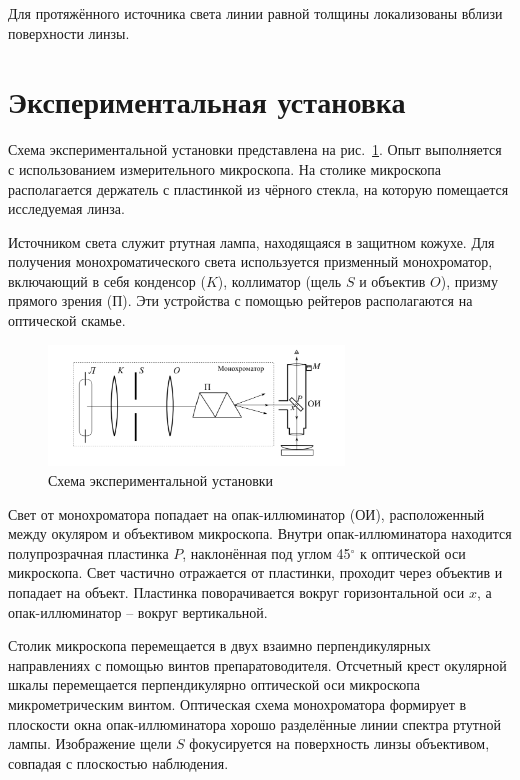 \documentclass[a4paper, 12pt]{article}
\begin{document}
Для протяжённого источника света линии равной толщины локализованы вблизи поверхности линзы.

\section*{Экспериментальная установка}
\quad Схема экспериментальной установки представлена на рис.~\ref{fig:setup}. Опыт выполняется с использованием измерительного микроскопа. На столике микроскопа располагается держатель с пластинкой из чёрного стекла, на которую помещается исследуемая линза.

Источником света служит ртутная лампа, находящаяся в защитном кожухе. Для получения монохроматического света используется призменный монохроматор, включающий в себя конденсор (\( K \)), коллиматор (щель \( S \) и объектив \( O \)), призму прямого зрения (\( П \)).  Эти устройства с помощью рейтеров располагаются на оптической скамье. 

\begin{figure}[H]
    \centering
    \includegraphics[width=0.7\textwidth]{setup.png}
    \caption{Схема экспериментальной установки}
    \label{fig:setup}
\end{figure}

Свет от монохроматора попадает на опак-иллюминатор (ОИ), расположенный между окуляром и объективом микроскопа. Внутри опак-иллюминатора находится полупрозрачная пластинка $P$, наклонённая под углом 45$^\circ$ к оптической оси микроскопа. Свет частично отражается от пластинки, проходит через объектив и попадает на объект. Пластинка поворачивается вокруг горизонтальной оси $x$, а опак-иллюминатор -- вокруг вертикальной.

Столик микроскопа перемещается в двух взаимно перпендикулярных направлениях с помощью винтов препаратоводителя. Отсчетный крест окулярной шкалы перемещается перпендикулярно оптической оси микроскопа микрометрическим винтом. Оптическая схема монохроматора формирует в плоскости окна опак-иллюминатора хорошо разделённые линии спектра ртутной лампы. Изображение щели $S$ фокусируется на поверхность линзы объективом, совпадая с плоскостью наблюдения.
\end{document}
